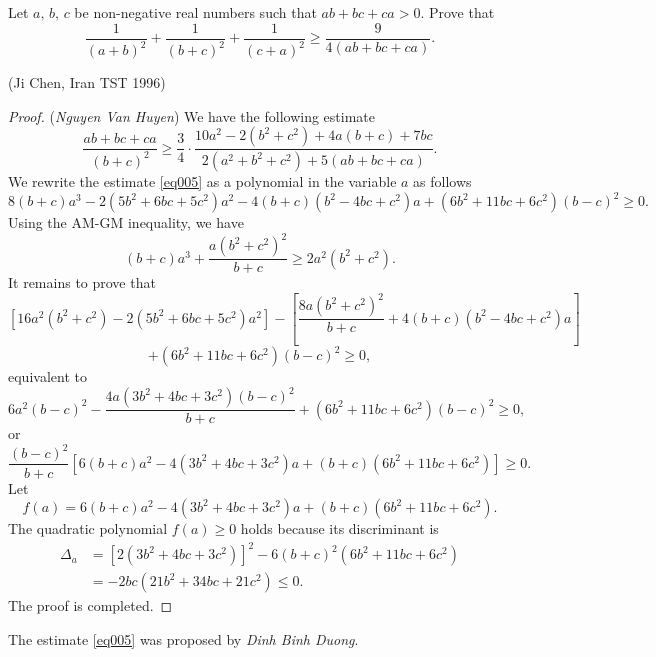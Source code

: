 \documentclass[12pt,a4paper]{book}
\begin{document}
\begin{pro_no_count}
Let $a,\,b,\,c$ be non-negative real numbers such that $ab+bc+ca>0.$ Prove that
\[\frac{1}{(a+b)^2}+\frac{1}{(b+c)^2}+\frac{1}{(c+a)^2} \ge \frac{9}{4(ab+bc+ca)}.\]
\begin{flushright}(Ji Chen, Iran TST 1996)\end{flushright}
\end{pro_no_count}

\begin{proof}
(\textit{Nguyen Van Huyen}) We have the following estimate
\begin{equation}\label{eq005}
\frac{ab+bc+ca}{(b+c)^2} \ge \frac{3}{4} \cdot \frac{10a^2-2(b^2+c^2)+4a(b+c)+7bc}{2(a^2+b^2+c^2)+5(ab+bc+ca)}.
\end{equation}
We rewrite the estimate \eqref{eq005} as a polynomial in the variable $a$ as follows
\[8(b+c)a^3-2(5b^2+6bc+5c^2)a^2-4(b+c)(b^2-4bc+c^2)a+(6b^2+11bc+6c^2)(b-c)^2 \ge 0.\]
Using the AM-GM inequality, we have
\[(b+c)a^3 + \frac{a(b^2+c^2)^2}{b+c} \ge 2a^2(b^2+c^2).\]
It remains to prove that
\[\left[16a^2(b^2+c^2) -2(5b^2+6bc+5c^2)a^2\right] - \left[\frac{8a(b^2+c^2)^2}{b+c} + 4(b+c)(b^2-4bc+c^2)a\right]\]
\[+(6b^2+11bc+6c^2)(b-c)^2 \ge 0,\]
equivalent to
\[6a^2(b-c)^2 - \frac{4a(3b^2+4bc+3c^2)(b-c)^2}{b+c} + (6b^2+11bc+6c^2)(b-c)^2 \ge 0,\]
or
\[\frac{(b-c)^2}{b+c}[6(b+c)a^2 - 4(3b^2+4bc+3c^2)a+(b+c)(6b^2+11bc+6c^2)] \ge 0.\]
Let
\[f(a) = 6(b+c)a^2 - 4(3b^2+4bc+3c^2)a + (b+c)(6b^2+11bc+6c^2).\]
The quadratic polynomial $f(a) \ge 0$ holds because its discriminant is
\[\begin{aligned}
\Delta_a & = [2(3b^2+4bc+3c^2)]^2 - 6(b+c)^2(6b^2+11bc+6c^2) \\
& = - 2bc(21b^2+34bc+21c^2) \le 0.
\end{aligned}\]
The proof is completed.
\end{proof}

\begin{remark}
The estimate \eqref{eq005} was proposed by \textit{Dinh Binh Duong}.
\end{remark}
\end{document}
